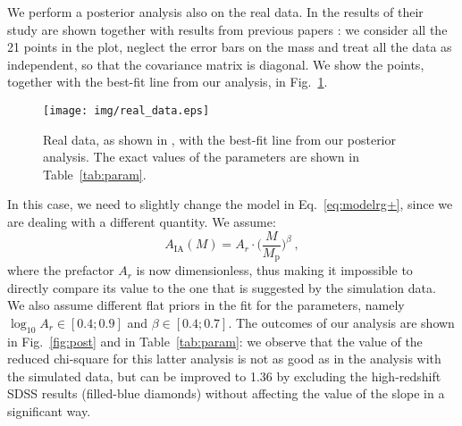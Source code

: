 \documentclass[a4paper,fleqn,usenatbib]{mnras}
\begin{document}
We perform a posterior analysis also on the real data. In \citet[figure 7]{vanUitertJoachimi2017} the results of their study are shown together with results from previous papers \citep{Joachimietal2011, Singhetal2015}: we consider all the 21 points in the plot, neglect the error bars on the mass
and treat all the data as independent, so that the covariance matrix is diagonal. We show the points, together with the best-fit line from our analysis, in Fig.~\ref{fig:realdata}.
\begin{figure}
	\centerline{	
	\texttt{[image: img/real\_data.eps]}}
	\caption{Real data, as shown in \citet[figure 7]{vanUitertJoachimi2017}, with the best-fit line from our posterior analysis. The exact values of the parameters are shown in Table~\ref{tab:param}.}
	\label{fig:realdata}
\end{figure}

In this case, we need to slightly change the model in Eq.~\ref{eq:modelrg+}, since we are dealing with a different quantity. We assume:
\begin{equation}
    A_{\mathrm{IA}} (M) = A_r \cdot  \biggl ( \frac{M}{M_{\mathrm{p}}} \biggl )^{\beta} \ ,
	\label{eq:modelrg+data}
\end{equation}
where the prefactor $A_r$ is now dimensionless, thus making it impossible to directly compare its value to the one that is suggested by the simulation data. We also assume different flat priors in the fit for the parameters, namely $\log_{10} A_r \in [0.4;0.9]$ and $\beta \in [0.4;0.7]$. The outcomes of our analysis are shown in Fig.~\ref{fig:post} and in Table~\ref{tab:param}: we observe that the value of the reduced chi-square for this latter analysis is not as good as in the analysis with the simulated data, but can be improved to 1.36 by excluding the high-redshift SDSS results (filled-blue diamonds) without affecting the value of the slope in a significant way.
\end{document}
